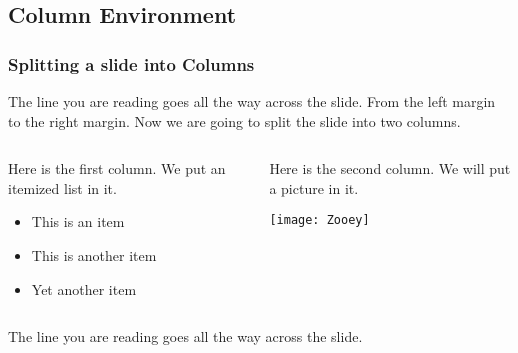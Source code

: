 \subsection{Column Environment}
\begin{frame}[label=ForSkipZoom]
\frametitle{Splitting a slide into Columns}

The line you are reading goes all the way across the slide.
From the left margin to the right margin.  Now we are going
to split the slide into two columns.

\bigskip

\begin{columns}[T]
  \begin{column}{0.5\textwidth}
    Here is the first column.  We put an itemized list in it.
    \begin{itemize}
      \item This is an item
      \item This is another item
      \item Yet another item
    \end{itemize}
  \end{column}

  \begin{column}{0.3\textwidth}
    Here is the second column.  We will put a picture in it.
    \centerline{\texttt{[image: Zooey]}}
  \end{column}
\end{columns}

\bigskip

The line you are reading goes all the way across the slide.

\end{frame}
